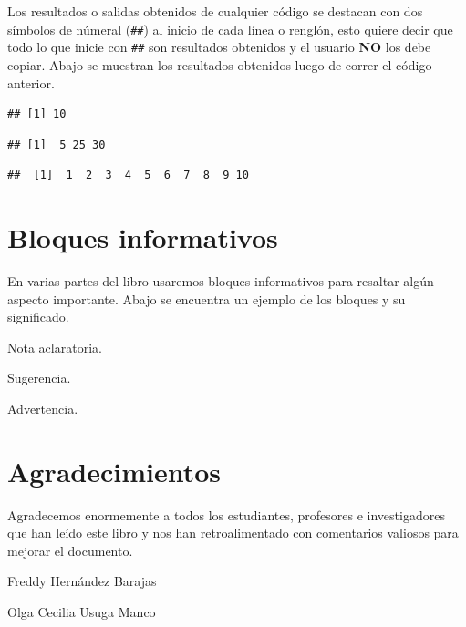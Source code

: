 \documentclass[
]{book}
\makeatletter
\newenvironment{kframe}{%
\medskip{}
\setlength{\fboxsep}{.8em}
 \def\at@end@of@kframe{}%
 \ifinner\ifhmode%
  \def\at@end@of@kframe{\end{minipage}}%
  \begin{minipage}{\columnwidth}%
 \fi\fi%
 \def\FrameCommand##1{\hskip\@totalleftmargin \hskip-\fboxsep
 \colorbox{shadecolor}{##1}\hskip-\fboxsep
     \hskip-\linewidth \hskip-\@totalleftmargin \hskip\columnwidth}%
 \MakeFramed {\advance\hsize-\width
   \@totalleftmargin\z@ \linewidth\hsize
   \@setminipage}}%
 {\par\unskip\endMakeFramed%
 \at@end@of@kframe}
\newenvironment{rmdblock}[1]
  {
  \begin{itemize}
  \renewcommand{\labelitemi}{
    \raisebox{-.7\height}[0pt][0pt]{
      {\setkeys{Gin}{width=3em,keepaspectratio}\texttt{[image: images/\#1]}}
    }
  }
  \setlength{\fboxsep}{1em}
  \begin{kframe}
  \item
  }
  {
  \end{kframe}
  \end{itemize}
  }
\newenvironment{rmdnote}
  {\begin{rmdblock}{note}}
  {\end{rmdblock}}
\newenvironment{rmdtip}
  {\begin{rmdblock}{tip}}
  {\end{rmdblock}}
\newenvironment{rmdwarning}
  {\begin{rmdblock}{warning}}
  {\end{rmdblock}}
\makeatother
\begin{document}
Los resultados o salidas obtenidos de cualquier código se destacan con dos símbolos de númeral (\texttt{\#\#}) al inicio de cada línea o renglón, esto quiere decir que todo lo que inicie con \texttt{\#\#} son resultados obtenidos y el usuario \textbf{NO} los debe copiar. Abajo se muestran los resultados obtenidos luego de correr el código anterior.

\begin{verbatim}
## [1] 10
\end{verbatim}

\begin{verbatim}
## [1]  5 25 30
\end{verbatim}

\begin{verbatim}
##  [1]  1  2  3  4  5  6  7  8  9 10
\end{verbatim}

\hypertarget{bloques-informativos}{%
\section*{Bloques informativos}\label{bloques-informativos}}

En varias partes del libro usaremos bloques informativos para resaltar algún aspecto importante. Abajo se encuentra un ejemplo de los bloques y su significado.

\begin{rmdnote}
Nota aclaratoria.
\end{rmdnote}

\begin{rmdtip}
Sugerencia.
\end{rmdtip}

\begin{rmdwarning}
Advertencia.
\end{rmdwarning}

\hypertarget{agradecimientos}{%
\section*{Agradecimientos}\label{agradecimientos}}

Agradecemos enormemente a todos los estudiantes, profesores e investigadores que han leído este libro y nos han retroalimentado con comentarios valiosos para mejorar el documento.

\begin{flushright}
Freddy Hernández Barajas

Olga Cecilia Usuga Manco
\end{flushright}
\end{document}
